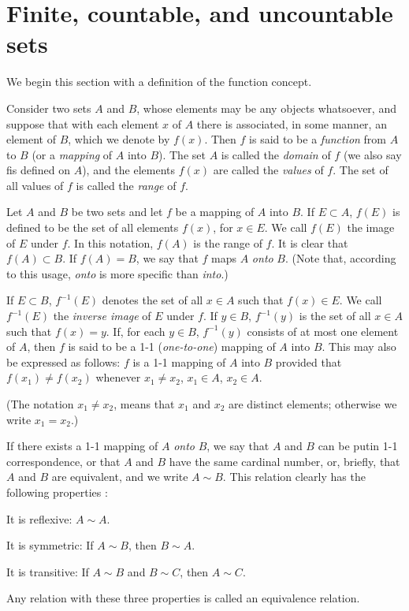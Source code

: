 \section{Finite, countable, and uncountable sets}

We begin this section with a definition of the function concept.
\begin{mydef}
    \label{def:2.1}
    Consider two sets $A$ and $B$, whose elements may be any objects whatsoever, and suppose that with each element $x$ of $A$ there is associated, in some manner, an element of $B$, which we denote by $f(x)$. Then $f$ is said to be a \emph{function} from $A$ to $B$ (or a \emph{mapping} of $A$ into $B$). The set $A$ is called the \emph{domain} of $f$ (we also say fis defined on $A$), and the elements $f(x)$ are called the \emph{values} of $f$. The set of all values of $f$ is called the \emph{range} of $f$.
\end{mydef}

\begin{mydef}
    \label{def:2.2}
    Let $A$ and $B$ be two sets and let $f$ be a mapping of $A$ into $B$.
    If $E \subset A$, $f(E)$ is defined to be the set of all elements $f(x)$, for $x \in E$. We call $f(E)$ the image of $E$ under $f$. In this notation, $f(A)$ is the range of $f$. It is clear that $f(A) \subset B$. If $f(A) = B$, we say that $f$ maps $A$ \emph{onto} $B$. (Note that, according
    to this usage, \emph{onto} is more specific than \emph{into}.)

    If $E \subset B$, $f^{-1}(E)$ denotes the set of all $x \in A$ such that $f(x)\in E$. We call $f^{-1}(E)$ the \emph{inverse image} of $E$ under $f$. If $y \in B$, $f^{-1}(y)$ is the set of all $x \in A$ such that $f(x) =y$. If, for each $y\in B$, $f^{-1}(y)$ consists of at most one element of $A$, then $f$ is said to be a 1-1 (\emph{one-to-one}) mapping of $A$ into $B$. This may also be expressed as follows: $f$ is a 1-1 mapping of $A$ into $B$ provided that $f(x_1) \neq f(x_2)$ whenever $x_1 \neq x_2$, $x_1 \in A$, $x_2 \in A$.

    (The notation $x_1 \neq x_2$, means that $x_1$ and $x_2$ are distinct elements; otherwise we write $x_1 = x_2$.)
\end{mydef}

\begin{mydef}
    \label{def:2.3}
    If there exists a 1-1 mapping of $A$ \emph{onto} $B$, we say that $A$ and $B$ can be putin 1-1 correspondence, or that $A$ and $B$ have the same cardinal number, or, briefly, that $A$ and $B$ are equivalent, and we write $A\sim B$. This relation
    clearly has the following properties :

    It is reflexive: $A\sim A$.

    It is symmetric: If $A\sim B$, then $B\sim A$.

    It is transitive: If $A\sim B$ and $B\sim C$, then $A\sim C$.

    Any relation with these three properties is called an equivalence relation.    
\end{mydef}

